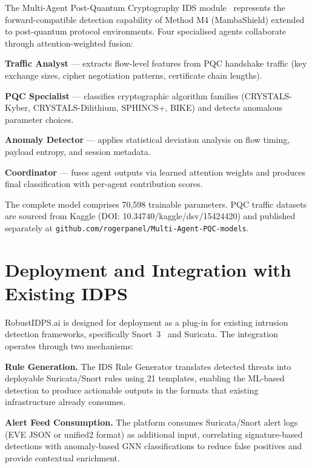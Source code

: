 The Multi-Agent Post-Quantum Cryptography IDS module~\cite{Anaedevha2026mapqc,NIST2024} represents the forward-compatible detection capability of Method M4 (MambaShield) extended to post-quantum protocol environments. Four specialised agents collaborate through attention-weighted fusion:

\noindent\textbf{Traffic Analyst} --- extracts flow-level features from PQC handshake traffic (key exchange sizes, cipher negotiation patterns, certificate chain lengths).

\noindent\textbf{PQC Specialist} --- classifies cryptographic algorithm families (CRYSTALS-Kyber, CRYSTALS-Dilithium, SPHINCS+, BIKE) and detects anomalous parameter choices.

\noindent\textbf{Anomaly Detector} --- applies statistical deviation analysis on flow timing, payload entropy, and session metadata.

\noindent\textbf{Coordinator} --- fuses agent outputs via learned attention weights and produces final classification with per-agent contribution scores.

The complete model comprises 70,598 trainable parameters. PQC traffic datasets are sourced from Kaggle (DOI: 10.34740/kaggle/dsv/15424420) and published separately at \texttt{github.com/rogerpanel/Multi-Agent-PQC-models}.


\section{Deployment and Integration with Existing IDPS}
\label{sec:deployment}

RobustIDPS.ai is designed for deployment as a plug-in for existing intrusion detection frameworks, specifically Snort~3~\cite{Roesch1999} and Suricata. The integration operates through two mechanisms:

\noindent\textbf{Rule Generation.} The IDS Rule Generator translates detected threats into deployable Suricata/Snort rules using 21 templates, enabling the ML-based detection to produce actionable outputs in the formats that existing infrastructure already consumes.

\noindent\textbf{Alert Feed Consumption.} The platform consumes Suricata/Snort alert logs (EVE JSON or unified2 format) as additional input, correlating signature-based detections with anomaly-based GNN classifications to reduce false positives and provide contextual enrichment.

